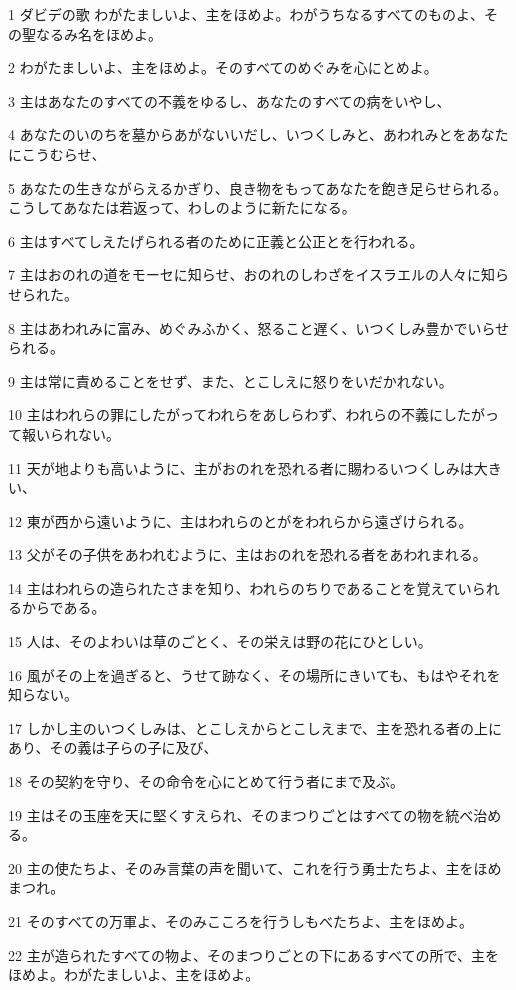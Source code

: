 \par 1 ダビデの歌 わがたましいよ、主をほめよ。わがうちなるすべてのものよ、その聖なるみ名をほめよ。
\par 2 わがたましいよ、主をほめよ。そのすべてのめぐみを心にとめよ。
\par 3 主はあなたのすべての不義をゆるし、あなたのすべての病をいやし、
\par 4 あなたのいのちを墓からあがないいだし、いつくしみと、あわれみとをあなたにこうむらせ、
\par 5 あなたの生きながらえるかぎり、良き物をもってあなたを飽き足らせられる。こうしてあなたは若返って、わしのように新たになる。
\par 6 主はすべてしえたげられる者のために正義と公正とを行われる。
\par 7 主はおのれの道をモーセに知らせ、おのれのしわざをイスラエルの人々に知らせられた。
\par 8 主はあわれみに富み、めぐみふかく、怒ること遅く、いつくしみ豊かでいらせられる。
\par 9 主は常に責めることをせず、また、とこしえに怒りをいだかれない。
\par 10 主はわれらの罪にしたがってわれらをあしらわず、われらの不義にしたがって報いられない。
\par 11 天が地よりも高いように、主がおのれを恐れる者に賜わるいつくしみは大きい、
\par 12 東が西から遠いように、主はわれらのとがをわれらから遠ざけられる。
\par 13 父がその子供をあわれむように、主はおのれを恐れる者をあわれまれる。
\par 14 主はわれらの造られたさまを知り、われらのちりであることを覚えていられるからである。
\par 15 人は、そのよわいは草のごとく、その栄えは野の花にひとしい。
\par 16 風がその上を過ぎると、うせて跡なく、その場所にきいても、もはやそれを知らない。
\par 17 しかし主のいつくしみは、とこしえからとこしえまで、主を恐れる者の上にあり、その義は子らの子に及び、
\par 18 その契約を守り、その命令を心にとめて行う者にまで及ぶ。
\par 19 主はその玉座を天に堅くすえられ、そのまつりごとはすべての物を統べ治める。
\par 20 主の使たちよ、そのみ言葉の声を聞いて、これを行う勇士たちよ、主をほめまつれ。
\par 21 そのすべての万軍よ、そのみこころを行うしもべたちよ、主をほめよ。
\par 22 主が造られたすべての物よ、そのまつりごとの下にあるすべての所で、主をほめよ。わがたましいよ、主をほめよ。

